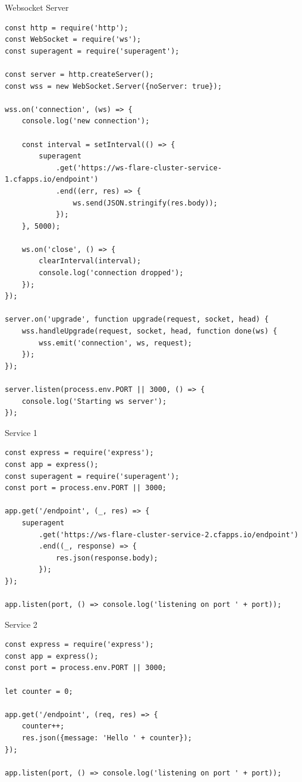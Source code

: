 \begin{listing}[H]
    \caption{Websocket Server}
    \label{listing:experiment-2-cluster-websocket-server}
    \begin{verbatim}
const http = require('http');
const WebSocket = require('ws');
const superagent = require('superagent');

const server = http.createServer();
const wss = new WebSocket.Server({noServer: true});

wss.on('connection', (ws) => {
    console.log('new connection');

    const interval = setInterval(() => {
        superagent
            .get('https://ws-flare-cluster-service-1.cfapps.io/endpoint')
            .end((err, res) => {
                ws.send(JSON.stringify(res.body));
            });
    }, 5000);

    ws.on('close', () => {
        clearInterval(interval);
        console.log('connection dropped');
    });
});

server.on('upgrade', function upgrade(request, socket, head) {
    wss.handleUpgrade(request, socket, head, function done(ws) {
        wss.emit('connection', ws, request);
    });
});

server.listen(process.env.PORT || 3000, () => {
    console.log('Starting ws server');
});
\end{verbatim}
\end{listing}

\begin{listing}[H]
    \caption{Service 1}
    \label{listing:experiment-2-service-1}
    \begin{verbatim}
const express = require('express');
const app = express();
const superagent = require('superagent');
const port = process.env.PORT || 3000;

app.get('/endpoint', (_, res) => {
    superagent
        .get('https://ws-flare-cluster-service-2.cfapps.io/endpoint')
        .end((_, response) => {
            res.json(response.body);
        });
});

app.listen(port, () => console.log('listening on port ' + port));
\end{verbatim}
\end{listing}

\begin{listing}[H]
    \caption{Service 2}
    \label{listing:experiment-2-service-2}
    \begin{verbatim}
const express = require('express');
const app = express();
const port = process.env.PORT || 3000;

let counter = 0;

app.get('/endpoint', (req, res) => {
    counter++;
    res.json({message: 'Hello ' + counter});
});

app.listen(port, () => console.log('listening on port ' + port));
\end{verbatim}
\end{listing}

